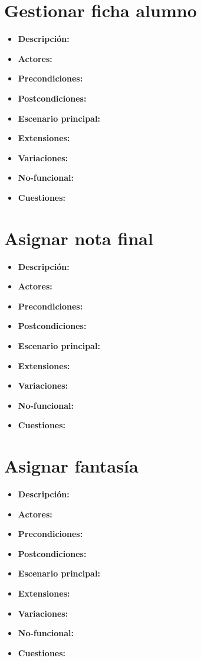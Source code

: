 \section{Gestionar ficha alumno}
\begin{itemize}
	\item \textbf{Descripción:}
	\item \textbf{Actores:}
	\item \textbf{Precondiciones:}
	\item \textbf{Postcondiciones:}
	\item \textbf{Escenario principal:}
	\item \textbf{Extensiones:}
	\item \textbf{Variaciones:}
	\item \textbf{No-funcional:}
	\item \textbf{Cuestiones:}
\end{itemize}

\section{Asignar nota final}
\begin{itemize}
	\item \textbf{Descripción:}
	\item \textbf{Actores:}
	\item \textbf{Precondiciones:}
	\item \textbf{Postcondiciones:}
	\item \textbf{Escenario principal:}
	\item \textbf{Extensiones:}
	\item \textbf{Variaciones:}
	\item \textbf{No-funcional:}
	\item \textbf{Cuestiones:}
\end{itemize}

\section{Asignar fantasía}
\begin{itemize}
	\item \textbf{Descripción:}
	\item \textbf{Actores:}
	\item \textbf{Precondiciones:}
	\item \textbf{Postcondiciones:}
	\item \textbf{Escenario principal:}
	\item \textbf{Extensiones:}
	\item \textbf{Variaciones:}
	\item \textbf{No-funcional:}
	\item \textbf{Cuestiones:}
\end{itemize}